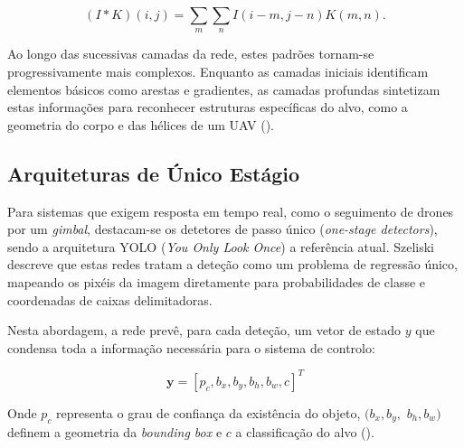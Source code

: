 \begin{equation}
(I * K)(i, j) = \sum_{m} \sum_{n} I(i-m, j-n) K(m, n).
\end{equation}

Ao longo das sucessivas camadas da rede, estes padrões tornam-se progressivamente mais complexos. Enquanto as camadas iniciais identificam elementos básicos como arestas e gradientes, as camadas profundas sintetizam estas informações para reconhecer estruturas específicas do alvo, como a geometria do corpo e das hélices de um UAV (\cite{szeliski2022}).

\subsection{Arquiteturas de Único Estágio}

Para sistemas que exigem resposta em tempo real, como o seguimento de drones por um \emph{gimbal}, destacam-se os detetores de passo único (\emph{one-stage detectors}), sendo a arquitetura YOLO (\emph{You Only Look Once}) a referência atual. Szeliski \cite{szeliski2022} descreve que estas redes tratam a deteção como um problema de regressão único, mapeando os pixéis da imagem diretamente para probabilidades de classe e coordenadas de caixas delimitadoras.

Nesta abordagem, a rede prevê, para cada deteção, um vetor de estado $y$ que condensa toda a informação necessária para o sistema de controlo:

\begin{equation}
\mathbf{y} = [p_c, b_x, b_y, b_h, b_w, c]^T
\end{equation}

Onde $p_c$ representa o grau de confiança da existência do objeto, $(b_x, b_y, $ $b_h, b_w)$ definem a geometria da \emph{bounding box} e $c$ a classificação do alvo (\cite{szeliski2022}).




